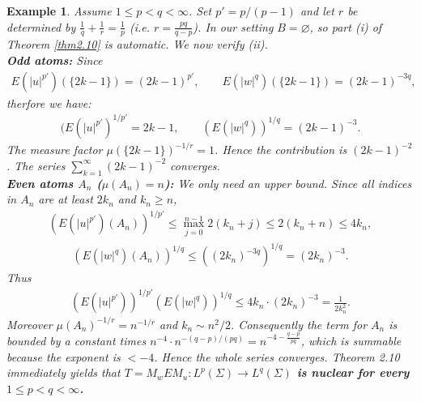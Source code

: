 \documentclass{amsart}
\newtheorem{exam}[thm]{Example}
\theoremstyle{definition}\newtheorem{defn}[thm]{Definition}
\theoremstyle{remark}
\numberwithin{equation}{section}
\begin{document}
\begin{exam}
	Assume $1\le p<q<\infty$. Set $p' = p/(p-1)$ and let $r$ be determined by $\frac1q+\frac1r=\frac1p$ (i.e. $r=\frac{pq}{q-p}$).  
	In our setting $B=\varnothing$, so part (i) of Theorem \ref{thm2.10} is automatic.  
	We now verify (ii).\\
	\textbf{Odd atoms:}
	  Since
	  \begin{align*}
	  	E(|u|^{p'})(\{2k-1\}) = (2k-1)^{p'},\qquad E(|w|^q)(\{2k-1\}) = (2k-1)^{-3q}, 
	  \end{align*}
	   therfore we have:  
	\begin{align*}
		(E(|u|^{p'})^{1/p'} = 2k-1,\qquad 
		(E(|w|^q))^{1/q} = (2k-1)^{-3}.
	\end{align*} 
	The measure factor $\mu(\{2k-1\})^{-1/r}=1$. Hence the contribution is $(2k-1)^{-2}$.  
	The series $\sum_{k=1}^{\infty} (2k-1)^{-2}$ converges.\\
	\textbf{Even atoms $A_n$ ($\mu(A_n)=n$):}
	  We only need an upper bound. Since all indices in $A_n$ are at least $2k_n$ and $k_n\ge n$,
	\begin{align*}
		(E(|u|^{p'})(A_n))^{1/p'} \le \max_{j=0}^{n-1}2(k_n+j) \le 2(k_n+n)\le 4k_n,
	\end{align*}
	\begin{align*}
		(E(|w|^q)(A_n))^{1/q} \le ((2k_n)^{-3q})^{1/q} = (2k_n)^{-3}.
	\end{align*} 
	Thus  
	\begin{align*}
		(E(|u|^{p'}))^{1/p'}(E(|w|^q))^{1/q} \le 4k_n\cdot(2k_n)^{-3}= \frac{1}{2k_n^{2}}.
	\end{align*}
	Moreover $\mu(A_n)^{-1/r}=n^{-1/r}$ and $k_n\sim n^{2}/2$. Consequently the term for $A_n$ is bounded by a constant times $n^{-4}\cdot n^{-(q-p)/(pq)} = n^{-4-\frac{q-p}{pq}}$, which is summable because the exponent is $<-4$.  
	Hence the whole series converges. Theorem 2.10 immediately yields that \textbf{$T = M_w E M_u : L^p(\Sigma) \to L^q(\Sigma)$ is nuclear for every $1\le p<q<\infty$.}
	

\end{exam}
\end{document}
